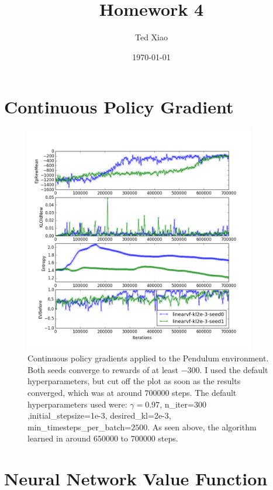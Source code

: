 \documentclass{article}%
\begin{document}
\title{Homework 4}
\author{Ted Xiao}
\date{\today}
\maketitle

\section{Continuous Policy Gradient}
\begin{figure}[h]
    \center
		\includegraphics[width=0.9\textwidth]{linearvf_plot4.png}
    \caption{Continuous policy gradients applied to the Pendulum environment. Both seeds converge to rewards of at least $-300$. I used the default hyperparameters, but cut off the plot as soon as the results converged, which was at around $700000$ steps. The default hyperparameters used were: $\gamma = 0.97$, n\_iter=$300$,initial\_stepsize=1e-3, desired\_kl=2e-3, min\_timesteps\_per\_batch=$2500$. As seen above, the algorithm learned in around $650000$ to $700000$ steps.}
\end{figure}

            
\newpage
\section{Neural Network Value Function}
\end{document}

